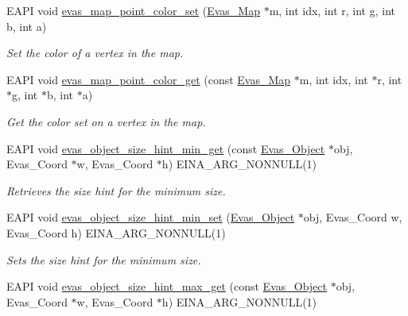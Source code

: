 \begin{DoxyCompactItemize}
EAPI void \hyperlink{Evas_8h_ae569741d778974e2825dc05cc3e68f9f}{evas\_\-map\_\-point\_\-color\_\-set} (\hyperlink{group__Evas__Object__Group__Map_gae94fcea124ae4135e8bb15a014b334dc}{Evas\_\-Map} $\ast$m, int idx, int r, int g, int b, int a)
\begin{DoxyCompactList}\small\item\em Set the color of a vertex in the map. \item\end{DoxyCompactList}\item 
EAPI void \hyperlink{Evas_8h_a40ae28dc015c5dad8a09ce5c6d764422}{evas\_\-map\_\-point\_\-color\_\-get} (const \hyperlink{group__Evas__Object__Group__Map_gae94fcea124ae4135e8bb15a014b334dc}{Evas\_\-Map} $\ast$m, int idx, int $\ast$r, int $\ast$g, int $\ast$b, int $\ast$a)
\begin{DoxyCompactList}\small\item\em Get the color set on a vertex in the map. \item\end{DoxyCompactList}\item 
EAPI void \hyperlink{group__Evas__Object__Group__Size__Hints_ga8f1430ec1cce66ee7763fbac7927f55e}{evas\_\-object\_\-size\_\-hint\_\-min\_\-get} (const \hyperlink{group__Evas__Object__Group_ga9e19e6dd1f517a0ba437c0114d3e7c97}{Evas\_\-Object} $\ast$obj, Evas\_\-Coord $\ast$w, Evas\_\-Coord $\ast$h) EINA\_\-ARG\_\-NONNULL(1)
\begin{DoxyCompactList}\small\item\em Retrieves the size hint for the minimum size. \item\end{DoxyCompactList}\item 
EAPI void \hyperlink{group__Evas__Object__Group__Size__Hints_ga373fc149848dd782ac942e4b5751eb4b}{evas\_\-object\_\-size\_\-hint\_\-min\_\-set} (\hyperlink{group__Evas__Object__Group_ga9e19e6dd1f517a0ba437c0114d3e7c97}{Evas\_\-Object} $\ast$obj, Evas\_\-Coord w, Evas\_\-Coord h) EINA\_\-ARG\_\-NONNULL(1)
\begin{DoxyCompactList}\small\item\em Sets the size hint for the minimum size. \item\end{DoxyCompactList}\item 
EAPI void \hyperlink{group__Evas__Object__Group__Size__Hints_ga868180db80ed59bfd7ebdc3dd71bb59a}{evas\_\-object\_\-size\_\-hint\_\-max\_\-get} (const \hyperlink{group__Evas__Object__Group_ga9e19e6dd1f517a0ba437c0114d3e7c97}{Evas\_\-Object} $\ast$obj, Evas\_\-Coord $\ast$w, Evas\_\-Coord $\ast$h) EINA\_\-ARG\_\-NONNULL(1)

\end{DoxyCompactItemize}
